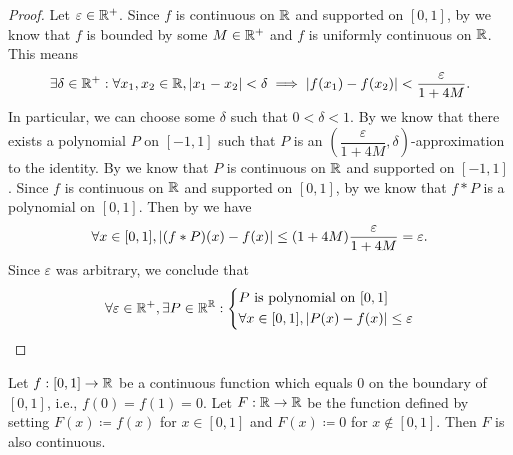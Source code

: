 \begin{proof}
  Let \(\varepsilon \in \mathbb{R}^+\).
  Since \(f\) is continuous on \(\mathbb{R}\) and supported on \([0, 1]\), by  we know that \(f\) is bounded by some \(M \in \mathbb{R}^+\) and \(f\) is uniformly continuous on \(\mathbb{R}\).
  This means
  \[
    \exists \delta \in \mathbb{R}^+ : \forall x_1, x_2 \in \mathbb{R}, \left\lvert x_1 - x_2\right\rvert < \delta \implies \left\lvert f(x_1) - f(x_2)\right\rvert < \dfrac{\varepsilon}{1 + 4M}.
  \]
  In particular, we can choose some \(\delta\) such that \(0 < \delta < 1\).
  By  we know that there exists a polynomial \(P\) on \([-1, 1]\) such that \(P\) is an \((\dfrac{\varepsilon}{1 + 4M}, \delta)\)-approximation to the identity.
  By  we know that \(P\) is continuous on \(\mathbb{R}\) and supported on \([-1, 1]\).
  Since \(f\) is continuous on \(\mathbb{R}\) and supported on \([0, 1]\), by  we know that \(f * P\) is a polynomial on \([0, 1]\).
  Then by  we have
  \[
    \forall x \in [0, 1], \left\lvert(f * P)(x) - f(x)\right\rvert \leq (1 + 4M) \dfrac{\varepsilon}{1 + 4M} = \varepsilon.
  \]
  Since \(\varepsilon\) was arbitrary, we conclude that
  \[
    \forall \varepsilon \in \mathbb{R}^+, \exists P \in \mathbb{R}^{\mathbb{R}} : \begin{dcases}
      P \text{ is polynomial on } [0, 1] \\
      \forall x \in [0, 1], \left\lvert P(x) - f(x)\right\rvert \leq \varepsilon
    \end{dcases}
  \]
\end{proof}

\begin{lem}\label{ii:3.8.16}
  Let \(f : [0, 1] \to \mathbb{R}\) be a continuous function which equals \(0\) on the boundary of \([0, 1]\), i.e., \(f(0) = f(1) = 0\).
  Let \(F : \mathbb{R} \to \mathbb{R}\) be the function defined by setting \(F(x) \coloneqq f(x)\) for \(x \in [0, 1]\) and \(F(x) \coloneqq 0\) for \(x \notin [0, 1]\).
  Then \(F\) is also continuous.
\end{lem}

